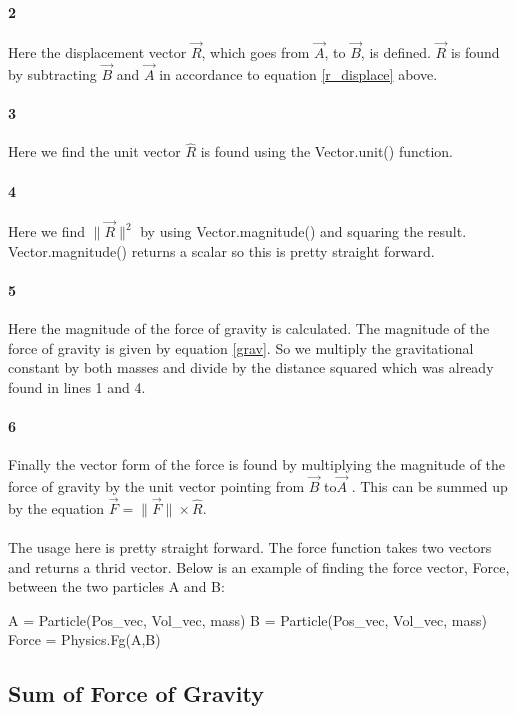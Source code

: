 \documentclass[15pt]{report}
\begin{document}
\paragraph{2} Here the displacement vector $\vec{R}$, which goes from $\vec{A}$, to $\vec{B}$, is defined. $\vec{R}$ is found by  subtracting $\vec{B}$ and $\vec{A}$ in accordance to equation \ref{r_displace} above.
\paragraph{3} Here we find the unit vector $\hat{R}$ is found using the Vector.unit() function.
\paragraph{4} Here we find $\| \vec{R} \| ^2$ by using Vector.magnitude() and squaring the result. Vector.magnitude() returns a scalar so this is pretty straight forward.
\paragraph{5} Here the magnitude of the force of gravity is calculated. The magnitude of the force of gravity is given by equation \ref{grav}. So we multiply the gravitational constant by both masses and divide by the distance squared which was already found in lines 1 and 4.
\paragraph{6} Finally the vector form of the force is found by multiplying the magnitude of the force of gravity by the unit vector pointing from $\vec{B}$ to$\vec{A}$ . This can be summed up by the equation $\vec{F} = \|\vec{F}\| \times \hat{R}$.

\paragraph{} The usage here is pretty straight forward. The force function takes two vectors and returns a thrid vector. 
Below is an example of finding the force vector, Force, between the two particles A and B:

\begin{code}
	A = Particle(Pos_vec, Vol_vec, mass)
	B = Particle(Pos_vec, Vol_vec, mass)
	Force = Physics.Fg(A,B)
\end{code}

\subsection{Sum of Force of Gravity}
\printbibliography
\end{document}
